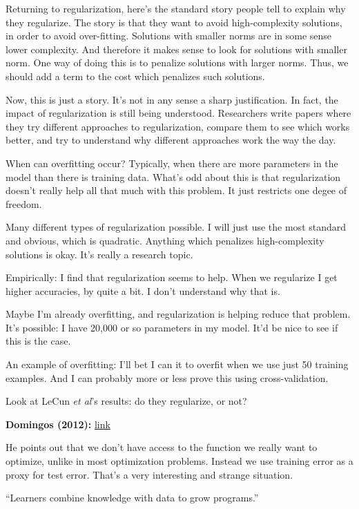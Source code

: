 \documentclass[12pt]{article}
\newcommand{\link}[2]{\href{#1}{#2}}
\begin{document}
Returning to regularization, here's the standard story people tell to
explain why they regularize.  The story is that they want to avoid
high-complexity solutions, in order to avoid over-fitting.  Solutions
with smaller norms are in some sense lower complexity.  And therefore
it makes sense to look for solutions with smaller norm.  One way of
doing this is to penalize solutions with larger norms.  Thus, we
should add a term to the cost which penalizes such solutions.

Now, this is just a story.  It's not in any sense a sharp
justification.  In fact, the impact of regularization is still being
understood.  Researchers write papers where they try different
approaches to regularization, compare them to see which works better,
and try to understand why different approaches work the way the day.

When can overfitting occur?  Typically, when there are more parameters
in the model than there is training data.  What's odd about this is
that regularization doesn't really help all that much with this
problem.  It just restricts one degee of freedom.

Many different types of regularization possible.  I will just use the
most standard and obvious, which is quadratic.  Anything which
penalizes high-complexity solutions is okay.  It's really a research
topic.

Empirically: I find that regularization seems to help.  When we
regularize I get higher accuracies, by quite a bit.  I don't
understand why that is.

Maybe I'm already overfitting, and regularization is helping reduce
that problem.  It's possible: I have 20,000 or so parameters in my
model.  It'd be nice to see if this is the case.

An example of overfitting: I'll bet I can it to overfit when we use
just 50 training examples.  And I can probably more or less prove this
using cross-validation.

Look at LeCun \emph{et al}'s results: do they regularize, or not?

\textbf{Domingos (2012):} \link{http://scholar.google.ca/scholar?cluster=4404716649035182981\&hl=en\&as\_sdt=0,5}{link}

He points out that we don't have access to the function we really want
to optimize, unlike in most optimization problems.  Instead we use
training error as a proxy for test error.  That's a very interesting
and strange situation.

``Learners combine knowledge with data to grow programs.''
\end{document}
